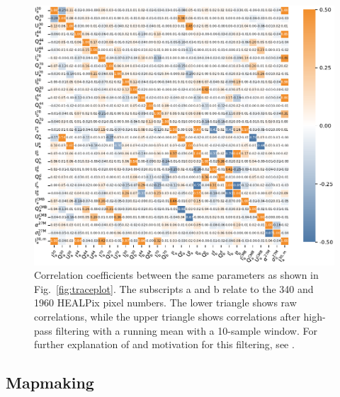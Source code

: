 \documentclass[twocolumn]{aa}
\begin{document}
\begin{figure}
  \center	
  \includegraphics[width=1\linewidth]{figs/corrmat_tod_BP10_ud_nomono_v3.pdf}
  \caption{Correlation coefficients between the same parameters as
    shown in Fig.~\ref{fig:traceplot}. The subscripts a and b relate to the 
    340 and 1960 HEALPix pixel numbers. The lower triangle shows
    raw correlations, while the upper triangle shows correlations
    after high-pass filtering with a running mean with a 10-sample
    window. For further explanation of and motivation for this
    filtering, see \citet{bp13}.  
    }
  \label{fig:param_corr_local}
\end{figure}

\subsection{Mapmaking}
\end{document}
